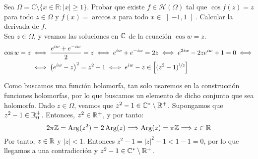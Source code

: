 \begin{ejercicio}
    Sea $\Omega = \mathbb{C} \setminus \{x \in \mathbb{R} : |x| \geq 1\}$. Probar que existe $f \in \mathcal{H}(\Omega)$ tal que $\cos f(z) = z$ para todo $z \in \Omega$ y $f(x) = \arccos x$ para todo $x \in \left] -1, 1 \right[$. Calcular la derivada de $f$.\\

    Sea $z\in \Omega$, y veamos las soluciones en $\mathbb{C}$ de la ecuación $\cos w = z$. \begin{align*}
        \cos w = z&\iff \dfrac{e^{iw}+e^{-iw}}{2} = z\iff e^{iw} + e^{-iw} = 2z\iff e^{2iw} - 2ze^{iw} + 1 = 0
        \iff\\&\iff \left(e^{iw}-z\right)^2 = z^2-1\iff e^{iw}-z\in \left[(z^2-1)^{\nicefrac{1}{2}}\right]
    \end{align*}

    Como buscamos una función holomorfa, tan solo usaremos en la construcción funciones holomorfas, por lo que buscamos un elemento de dicho conjunto que sea holomorfo. Dado $z\in \Omega$, veamos que $z^2-1\in \mathbb{C}^*\setminus\mathbb{R}^+$. Supongamos que $z^2-1\in \mathbb{R}^+_0$. Entonces, $z^2\in \mathbb{R}^+$, y por tanto:
    \begin{equation*}
        2\pi\mathbb{Z}=\operatorname{Arg}(z^2)=2\operatorname{Arg}(z)\Longrightarrow \operatorname{Arg}(z)=\pi\mathbb{Z}\Longrightarrow z\in \mathbb{R}
    \end{equation*}
    Por tanto, $z\in \mathbb{R}$ y $|z|<1$. Entonces $z^2-1=|z|^2-1<1-1=0$, por lo que llegamos a una contradicción y $z^2-1\in \mathbb{C}^*\setminus\mathbb{R}^+$.\\


\end{ejercicio}
